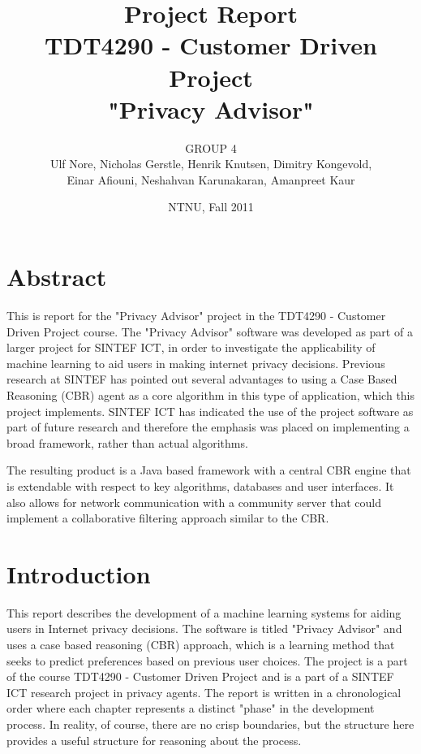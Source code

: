 \documentclass[11pt]{book}
\title{Project Report\\
TDT4290 - Customer Driven Project \\ 
"Privacy Advisor"}
\author{GROUP 4\\
Ulf Nore, Nicholas Gerstle, Henrik Knutsen, Dimitry Kongevold,\\ 
Einar Afiouni, Neshahvan Karunakaran, Amanpreet Kaur}
\date{NTNU, Fall 2011}
\begin{document}
\frontmatter
\maketitle

\chapter*{\centering Abstract}
This is report for the "Privacy Advisor" project in the TDT4290 - Customer Driven
Project course. The "Privacy Advisor"
software was developed as part of a larger project for SINTEF ICT, in
order to investigate the applicability of machine learning to aid users in
making internet privacy decisions. Previous research at SINTEF has pointed
out several advantages to using a Case Based Reasoning (CBR) agent as
a core algorithm in this type of application, which this project implements. SINTEF ICT
has indicated the use of the project software as part of future
research and therefore the emphasis was placed on implementing a broad
framework, rather than actual algorithms.

The resulting product is a Java based framework with a central CBR
engine that is extendable with respect to key algorithms, databases
and user interfaces. It also allows for network communication with a
community server that could implement a collaborative filtering approach 
similar to the CBR.


\dominitoc

\listoftables
\listoffigures
\tableofcontents



\chapter{Introduction}

This report describes the development of a machine learning systems for aiding users in Internet privacy decisions. The software is titled "Privacy Advisor" and uses a case based reasoning (CBR) approach, which is a learning method that seeks to predict preferences based on previous user choices. The project is a part of the course TDT4290 - Customer Driven Project and is a part of a SINTEF ICT research project in privacy agents. The report is written in a chronological order where each chapter represents a distinct "phase" in the development process. In reality, of course, there are no crisp boundaries, but the structure here provides a useful structure for reasoning about the process. 
\end{document}
